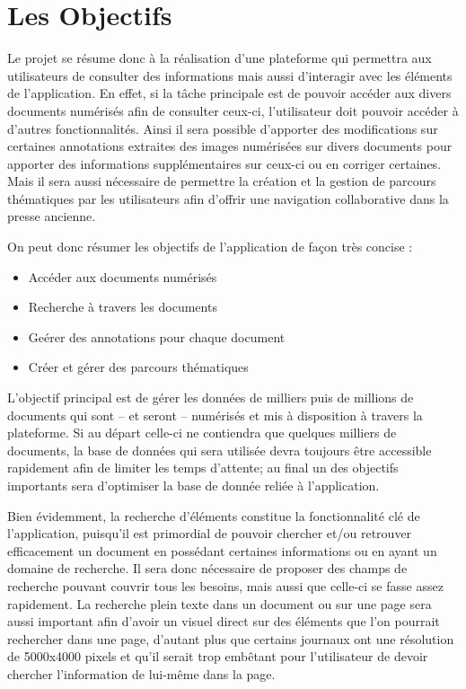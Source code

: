 \section{Les Objectifs}
	\label{sec:objectifs}

    Le projet se résume donc à la réalisation d’une plateforme qui permettra aux utilisateurs
    de consulter des informations mais aussi d’interagir avec les éléments de l’application.
    En effet, si la tâche principale est de pouvoir accéder aux divers documents numérisés afin
    de consulter ceux-ci, l’utilisateur doit pouvoir accéder à d’autres fonctionnalités.
    Ainsi il sera possible d'apporter des modifications sur certaines annotations
    extraites des images numérisées sur divers documents pour apporter des informations
    supplémentaires sur ceux-ci ou en corriger certaines. Mais il sera aussi nécessaire
    de permettre la création et la gestion de parcours thématiques par les utilisateurs
    afin d’offrir une navigation collaborative dans la presse ancienne.

    On peut donc résumer les objectifs de l’application de façon très concise :

    \begin{itemize}
        \item{Accéder aux documents numérisés}
        \item{Recherche à travers les documents}
        \item{Geérer des annotations pour chaque document}
        \item{Créer et gérer des parcours thématiques}
    \end{itemize}

    L’objectif principal est de gérer les données de milliers puis de millions de documents
    qui sont – et seront – numérisés et mis à disposition à travers la plateforme.
    Si au départ celle-ci ne contiendra que quelques milliers de documents, la base de données
    qui sera utilisée devra toujours être accessible rapidement afin de limiter les temps d’attente;
    au final un des objectifs importants sera d’optimiser la base de donnée reliée à l’application.

    Bien évidemment, la recherche d’éléments constitue la fonctionnalité clé de l’application,
    puisqu’il est primordial de pouvoir chercher et/ou retrouver efficacement un document
    en possédant certaines informations ou en ayant un domaine de recherche. Il sera donc nécessaire
    de proposer des champs de recherche pouvant couvrir tous les besoins, mais aussi que celle-ci
    se fasse assez rapidement. La recherche plein texte dans un document ou sur une page
    sera aussi important afin d’avoir un visuel direct sur des éléments que l’on pourrait rechercher
    dans une page, d’autant plus que certains journaux ont une résolution de 5000x4000 pixels et
    qu’il serait trop embêtant pour l’utilisateur de devoir chercher l’information de lui-même dans la page.

